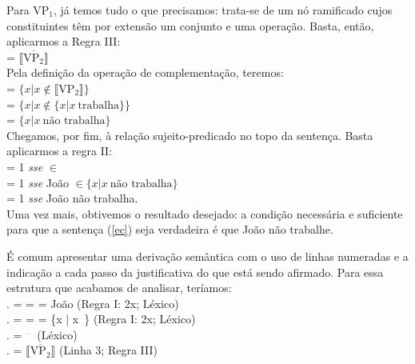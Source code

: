 \n Para VP$_{1}$, já temos tudo o que precisamos: trata-se de um nó ramificado cujos constituintes têm por extensão um conjunto e uma operação. Basta, então, aplicarmos a Regra III:\\

\n {} = $\overline{\llbracket \text{VP}_{2} \rrbracket}$\\

\n Pela definição da operação de complementação, teremos:\\

\n {} = $\{x | x \not\in \llbracket \text{VP}_{2} \rrbracket \}$\\

\n {} = $\{x | x \not\in \{x | x\ \text{trabalha}\} \}$ \\

\n {} = $\{x | x\ \text{não trabalha}\}$\\

\n Chegamos, por fim, à relação sujeito-predicado no topo da sentença. Basta aplicarmos a regra II:\\

\n {} = 1 \textit{sse}  $\in$  \\

\n {} = 1 \textit{sse} João $\in \{x | x\ \text{não trabalha}\}$ \\

\n {} = 1 \textit{sse} João não trabalha.\\


\n Uma vez mais, obtivemos o resultado desejado: a condição
necessária e suficiente para que a sentença (\ref{ec}) seja
verdadeira é que João não trabalhe.

É comum apresentar uma derivação semântica com o uso de linhas numeradas e a indicação a cada passo da
justificativa do que está sendo afirmado. Para essa estrutura que acabamos de analisar, teríamos: \\

.  =  =  = João \hfill (Regra I: 2x; Léxico)\\

.  =  =  = \{x | x\ \} \hfill (Regra I: 2x; Léxico)\\

.  = $^{\overline{\ \ \ \ }}$ \hfill (Léxico)\\

.  = $\overline{\llbracket \text{VP}_{2} \rrbracket}$ \hfill (Linha 3; Regra III)\\

